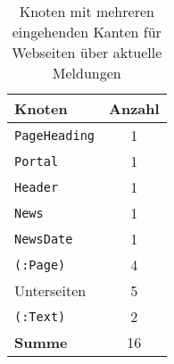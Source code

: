         \begin{table}[!h]
            \centering
            \begin{tabular}{|l|c|}
                \hline
                \textbf{Knoten} & \multicolumn{1}{l|}{\textbf{Anzahl}} \\ \hline
                \texttt{PageHeading}     & 1                                    \\ \hline
                \texttt{Portal}          & 1                                    \\ \hline
                \texttt{Header}          & 1                                    \\ \hline
                \texttt{News}            & 1                                    \\ \hline
                \texttt{NewsDate}        & 1                                    \\ \hline
                \texttt{(:Page)}          & 4                                    \\ \hline
                Unterseiten     & 5                                    \\ \hline
                \texttt{(:Text)}           & 2                                    \\ \hline
                \textbf{Summe}  & 16                                   \\ \hline
                \end{tabular}
            \caption{Knoten mit mehreren eingehenden Kanten für Webseiten über aktuelle Meldungen}
            \label{table:findingsNewsFiguresSharedNodes}
        \end{table}
